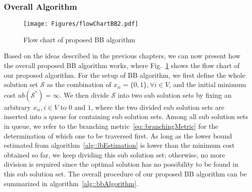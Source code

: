 \subsubsection{Overall Algorithm}
\begin{figure}
\begin{center}
\texttt{[image: Figures/flowChartBB2.pdf]}
\caption{\label{fig::flowChartBB}Flow chart of proposed BB algorithm}
\end{center}
\end{figure}
Based on the ideas described in the previous chapters, we can now present how the overall proposed BB algorithm works, where Fig.~\ref{fig::flowChartBB} shows the flow chart of our proposed algorithm.
For the setup of BB algorithm, we first define the whole solution set $\mathcal{S}$ as the combination of $x_{ii} = \{0,1\}, \forall i \in V$, and the initial minimum cost $ub(\mathcal{S}^*) = \infty$.
We then divide $\mathcal{S}$ into two sub solution sets by fixing an arbitrary $x_{ii}, i \in V$ to $0$ and $1$, where the two divided sub solution sets are inserted into a queue for containing sub solution sets.
Among all sub solution sets in queue, we refer to the branching metric~\eqref{eq::branchingMetric} for the determination of which one to be traversed first.
As long as the lower bound estimated from algorithm~\ref{alg::lbEstimation} is lower than the minimum cost obtained so far, we keep dividing this sub solution set; otherwise, no more division is required since the optimal solution has no possibility to be found in this sub solution set.
The overall procedure of our proposed BB algorithm can be summarized in algorithm~\ref{alg::bbAlgorithm}.
\IncMargin{1em}
